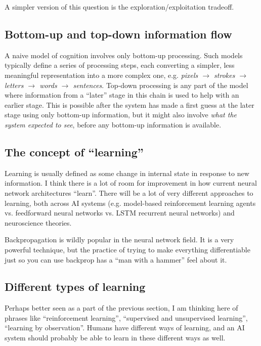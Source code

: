 \documentclass[10pt,a4paper]{article}
\newcommand{\nquote}[1]{``{#1}''}
\begin{document}
A simpler version of this question is the exploration/exploitation tradeoff.

\subsection{Bottom-up and top-down information flow}
A naive model of cognition involves only bottom-up processing. Such models typically define a series of processing steps, each converting a simpler, less meaningful representation into a more complex one, e.g. \emph{pixels $\rightarrow$ strokes $\rightarrow$ letters $\rightarrow$ words $\rightarrow$ sentences}. Top-down processing is any part of the model where information from a \nquote{later} stage in this chain is used to help with an earlier stage. This is possible after the system has made a first guess at the later stage using only bottom-up information, but it might also involve \emph{what the system expected to see}, before any bottom-up information is available.

\subsection{The concept of \nquote{learning}}
Learning is usually defined as some change in internal state in response to new information. I think there is a lot of room for improvement in how current neural network architectures \nquote{learn}. There will be a lot of very different approaches to learning, both across AI systems (e.g. model-based reinforcement learning agents vs. feedforward neural networks vs. LSTM recurrent neural networks) and neuroscience theories.

Backpropagation is wildly popular in the neural network field. It is a very powerful technique, but the practice of trying to make everything differentiable just so you can use backprop has a \nquote{man with a hammer} feel about it.

\subsection{Different types of learning}
Perhaps better seen as a part of the previous section, I am thinking here of phrases like \nquote{reinforcement learning}, \nquote{supervised and unsupervised learning}, \nquote{learning by observation}. Humans have different ways of learning, and an AI system should probably be able to learn in these different ways as well.
\end{document}
